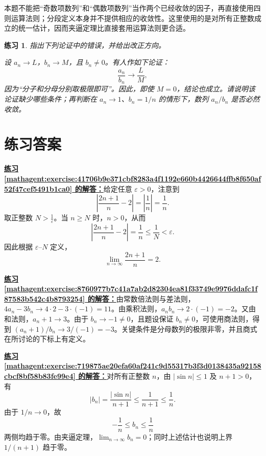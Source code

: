 \documentclass[UTF8,fontset=fandol,11pt]{ctexart}
\newtheorem{exercise}[definition]{练习}
\begin{document}
本题不能把“奇数项数列”和“偶数项数列”当作两个已经收敛的因子，再直接使用四则运算法则；分段定义本身并不提供相应的收敛性。这里使用的是对所有正整数成立的统一估计，因而夹逼定理比直接套用运算法则更合适。\par
\begin{exercise}
\label{mathagent:exercise:8abcf554ae0dc9fac987c0845b0411f261b8e87e238da3265a9997b91baee0f0}
指出下列论证中的错误，并给出改正方向。

设 $a_n\to L$，$b_n\to M$，且 $b_n\neq0$。有人作如下论证：
\[
\frac{a_n}{b_n}\to\frac{L}{M},
\]
因为“分子和分母分别取极限即可”。因此，即使 $M=0$，结论也成立。请说明该论证缺少哪些条件；再判断在 $a_n\to1$、$b_n=1/n$ 的情形下，数列 $a_n/b_n$ 是否必然收敛。
\end{exercise}
\section*{练习答案}
\par\noindent\textbf{\hyperref[mathagent:exercise:41706b9e371cbf8283a4f1192e660b4426644ffb8f650af52f47cef5491b1ca0]{练习 \ref*{mathagent:exercise:41706b9e371cbf8283a4f1192e660b4426644ffb8f650af52f47cef5491b1ca0} 的解答：}}给定任意 $\varepsilon>0$，注意到
\[
\left|\frac{2n+1}{n}-2\right|=\left|\frac{1}{n}\right|=\frac{1}{n}.
\]
取正整数 $N>\frac{1}{\varepsilon}$。当 $n\geq N$ 时，$n>0$，从而
\[
\left|\frac{2n+1}{n}-2\right|=\frac{1}{n}\leq\frac{1}{N}<\varepsilon.
\]
因此根据 $\varepsilon$--$N$ 定义，
\[
\lim_{n\to\infty}\frac{2n+1}{n}=2.
\]\par
\par\noindent\textbf{\hyperref[mathagent:exercise:8760977b7c41a7ab2d82304ea81f33749e9976ddafc1f87583b542c4b8793254]{练习 \ref*{mathagent:exercise:8760977b7c41a7ab2d82304ea81f33749e9976ddafc1f87583b542c4b8793254} 的解答：}}由常数倍法则与差法则，$4a_n-3b_n\to4\cdot2-3\cdot(-1)=11$。由乘积法则，$a_nb_n\to2\cdot(-1)=-2$。又由和法则，$a_n+1\to3$。由于 $b_n\to-1\neq0$，且题设保证 $b_n\neq0$，可使用商法则，得到 $(a_n+1)/b_n\to3/(-1)=-3$。关键条件是分母数列的极限非零，并且商式在所讨论的下标上有定义。\par
\par\noindent\textbf{\hyperref[mathagent:exercise:719875ae20efa60af241c9d55317b3f3d0138435a92158cbcf8bf58b83fe99e4]{练习 \ref*{mathagent:exercise:719875ae20efa60af241c9d55317b3f3d0138435a92158cbcf8bf58b83fe99e4} 的解答：}}对所有正整数 $n$，由 $|\sin n|\leq1$ 及 $n+1>0$，有
\[
|b_n|=\frac{|\sin n|}{n+1}\leq\frac1{n+1}\leq\frac1n.
\]
由于 $1/n\to0$，故
\[
-\frac1n\leq b_n\leq\frac1n
\]
两侧均趋于零。由夹逼定理，$\displaystyle\lim_{n\to\infty}b_n=0$；同时上述估计也说明上界 $1/(n+1)$ 趋于零。
\end{document}
